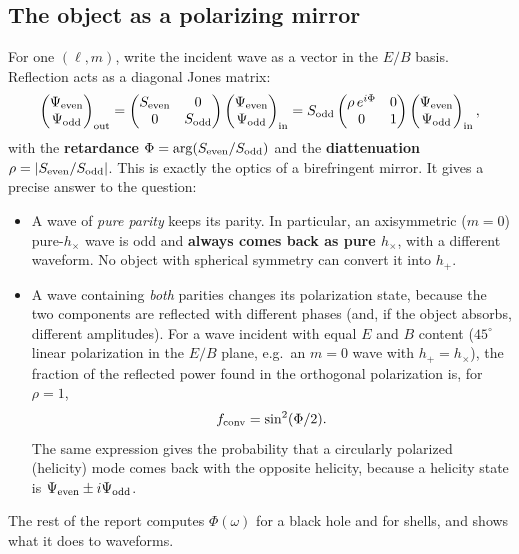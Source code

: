 \subsection{The object as a polarizing mirror}
For one $(\ell,m)$, write the incident wave as a vector in the $E/B$ basis. Reflection acts as a diagonal Jones matrix:
\begin{equation}
\begin{pmatrix}\Psi_{\rm even}\\ \Psi_{\rm odd}\end{pmatrix}_{\rm out}=
\begin{pmatrix}S_{\rm even}&0\\0&S_{\rm odd}\end{pmatrix}\begin{pmatrix}\Psi_{\rm even}\\ \Psi_{\rm odd}\end{pmatrix}_{\rm in}
=S_{\rm odd}\begin{pmatrix}\rho\,e^{i\Phi}&0\\0&1\end{pmatrix}\begin{pmatrix}\Psi_{\rm even}\\ \Psi_{\rm odd}\end{pmatrix}_{\rm in},
\end{equation}
with the \textbf{retardance} $\Phi=\arg(S_{\rm even}/S_{\rm odd})$ and the \textbf{diattenuation} $\rho=|S_{\rm even}/S_{\rm odd}|$.
This is exactly the optics of a birefringent mirror. It gives a precise answer to the question:
\begin{itemize}
\item A wave of \emph{pure parity} keeps its parity. In particular, an axisymmetric ($m=0$) pure-$h_\times$ wave is odd and
\textbf{always comes back as pure $h_\times$}, with a different waveform. No object with spherical symmetry can convert
it into $h_+$.
\item A wave containing \emph{both} parities changes its polarization state, because the two components are reflected
with different phases (and, if the object absorbs, different amplitudes). For a wave incident with equal $E$ and $B$
content ($45^\circ$ linear polarization in the $E/B$ plane, e.g.\ an $m=0$ wave with $h_+=h_\times$), the fraction of the
reflected power found in the orthogonal polarization is, for $\rho=1$,
\begin{equation}
f_{\rm conv}=\sin^2(\Phi/2).
\label{eq:conv}
\end{equation}
The same expression gives the probability that a circularly polarized (helicity) mode comes back with the opposite
helicity, because a helicity state is $\Psi_{\rm even}\pm i\Psi_{\rm odd}$.
\end{itemize}
The rest of the report computes $\Phi(\omega)$ for a black hole and for shells, and shows what it does to waveforms.
